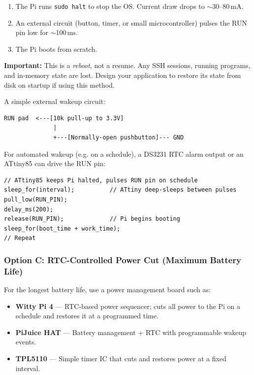 \documentclass[11pt,letter]{article}
\begin{document}
\begin{enumerate}
  \item The Pi runs \texttt{sudo halt} to stop the OS. Current draw drops to $\sim$30--80\,mA.
  \item An external circuit (button, timer, or small microcontroller) pulses the RUN pin low for $\sim$100\,ms.
  \item The Pi boots from scratch.
\end{enumerate}

\begin{warnbox}
\textbf{Important:} This is a \emph{reboot}, not a resume. Any SSH sessions, running programs, and in-memory state are lost. Design your application to restore its state from disk on startup if using this method.
\end{warnbox}

A simple external wakeup circuit:
\begin{lstlisting}[caption={Simple RUN pin wakeup --- momentary switch circuit}]
RUN pad  <---[10k pull-up to 3.3V]
              |
              +---[Normally-open pushbutton]--- GND
\end{lstlisting}

For automated wakeup (e.g. on a schedule), a DS3231 RTC alarm output or an ATtiny85 can drive the RUN pin:
\begin{lstlisting}[caption={ATtiny85 pseudocode for timed wakeup}]
// ATtiny85 keeps Pi halted, pulses RUN pin on schedule
sleep_for(interval);          // ATtiny deep-sleeps between pulses
pull_low(RUN_PIN);
delay_ms(200);
release(RUN_PIN);             // Pi begins booting
sleep_for(boot_time + work_time);
// Repeat
\end{lstlisting}

\subsubsection{Option C: RTC-Controlled Power Cut (Maximum Battery Life)}

For the longest battery life, use a power management board such as:
\begin{itemize}
  \item \textbf{Witty Pi 4} --- RTC-based power sequencer; cuts all power to the Pi on a schedule and restores it at a programmed time.
  \item \textbf{PiJuice HAT} --- Battery management + RTC with programmable wakeup events.
  \item \textbf{TPL5110} --- Simple timer IC that cuts and restores power at a fixed interval.
\end{itemize}
\end{document}
